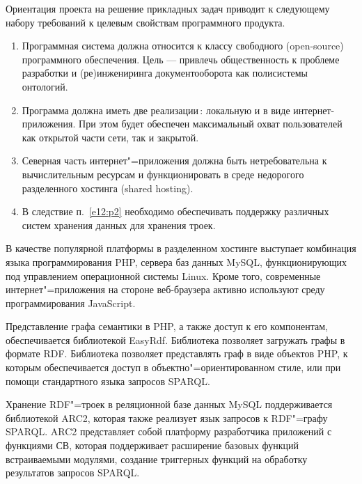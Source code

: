 \documentclass[utf8]{../IncArticle}
\begin{document}
Ориентация проекта на решение прикладных задач приводит к следующему
набору требований к целевым свойствам программного продукта.
\begin{enumerate}
\item Программная система должна относится к классу свободного
  (open-source) программного обеспечения. Цель --- привлечь
  общественность к проблеме разработки и (ре)инжениринга
  документооборота как полисистемы онтологий.
\item Программа должна иметь две реализации\,: локальную и в виде
  интернет-приложения. При этом будет обеспечен максимальный охват
  пользователей как открытой части сети, так и закрытой.
\item Северная часть интернет"=приложения должна быть нетребовательна
  к вычислительным ресурсам и функционировать в среде недорогого
  разделенного хостинга (shared hosting).  \label{e12:p2}
\item В следствие п.~\ref{e12:p2} необходимо обеспечивать поддержку
  различных систем хранения данных для хранения троек.
\end{enumerate}
В качестве популярной платформы в разделенном хостинге выступает
комбинация языка программирования PHP, сервера баз данных MySQL,
функционирующих под управлением операционной системы Linux.  Кроме
того, современные интернет"=приложения на стороне веб-браузера активно
используют среду программирования JavaScript.

Представление графа семантики в PHP, а также доступ к его компонентам,
обеспечивается библиотекой EasyRdf.  Библиотека позволяет загружать
графы в формате RDF. Библиотека позволяет представлять граф в виде
объектов PHP, к которым обеспечивается доступ в
объектно"=ориентированном стиле, или при помощи стандартного языка
запросов SPARQL.

Хранение RDF"=троек в реляционной базе данных MySQL поддерживается
библиотекой ARC2, которая также реализует язык запросов к
RDF"=графу SPARQL.  ARC2 представляет собой платформу разработчика
приложений с функциями СВ, которая поддерживает расширение базовых
функций встраиваемыми модулями, создание триггерных функций на
обработку результатов запросов SPARQL.
\end{document}
